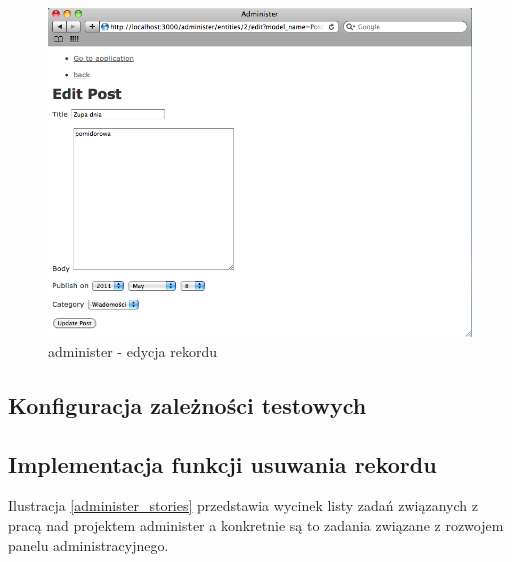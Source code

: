 	\begin{figure}[!h]
		\begin{center}
			\includegraphics[width=\linewidth]{images/administer_edit.png}
			\caption{administer - edycja rekordu}
			\label{administer_edit}
		\end{center}
	\end{figure}
  
  \subsection{Konfiguracja zależności testowych}
    
  \subsection{Implementacja funkcji usuwania rekordu}
    
    Ilustracja \ref{administer_stories}  przedstawia wycinek listy zadań związanych z pracą nad projektem administer a konkretnie są to zadania związane z rozwojem panelu administracyjnego.
    
    \clearpage
    
